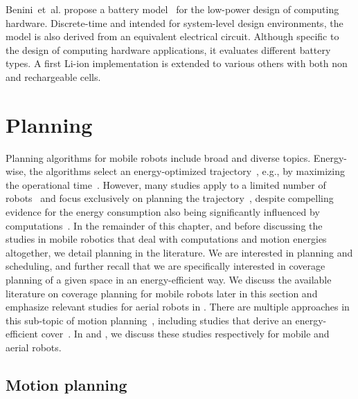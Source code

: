 Benini~et~al. propose a battery model~\citep{benini2001discrete} for the low-power design of computing hardware. Discrete-time and intended for system-level design environments, the model is also derived from an equivalent electrical circuit. Although specific to the design of computing hardware applications, it evaluates different battery types. A first Li-ion implementation is extended to various others with both non and rechargeable cells.


\section{Planning}
\label{sec:soa-motion-pl}

Planning algorithms for mobile robots include broad and diverse topics. Energy-wise, the algorithms select an energy-optimized trajectory~\citep{mei2004energy}, e.g., by maximizing the operational time~\citep{wahab2015energy}. However, many studies apply to a limited number of robots~\citep{kim2005energy} and focus exclusively on planning the trajectory~\citep{kim2008minimum}, despite compelling evidence for the energy consumption also being significantly influenced by computations~\citep{ondruska2015scheduled,mei2005case}. 
In the remainder of this chapter, and before discussing the studies in mobile robotics that deal with computations and motion energies altogether, we detail planning in the literature. 
We are interested in planning and scheduling, and further recall that we are specifically interested in coverage planning of a given space in an energy-efficient way. We discuss the available literature on coverage planning for mobile robots later in this section and emphasize relevant studies for aerial robots in . There are multiple approaches in this sub-topic of motion planning~\citep{choset2001coverage,cabreira2019survey}, including studies that derive an energy-efficient cover~\citep{wei2018coverage,cabreira2018energy}. In  and , we discuss these studies respectively for mobile and aerial robots. 

\subsection{Motion planning}

